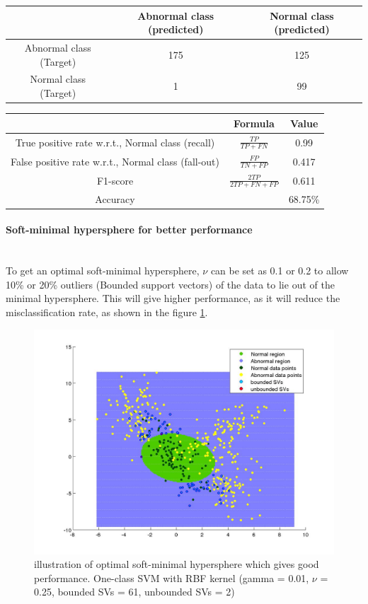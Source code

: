 \documentclass[fleqn]{article}
\newcommand{\myparagraph}[1]{\paragraph{#1}\mbox{}\\}
\begin{document}
\begin{center}
  \begin{longtable}{ c | c | c  }
	\multicolumn{1}{c}{ } & 
	\multicolumn{1}{c}{Abnormal class (predicted)} & 
	\multicolumn{1}{c}{Normal class (predicted)} \\
    \hline
    Abnormal class (Target)& 175 & 125 \\ \hline
    Normal class (Target)&  1 & 99 \\ \hline
  \end{longtable}
\end{center}    

\begin{center}
  \begin{longtable}{ c | c | c  }
  	\multicolumn{1}{c}{ } & 
	\multicolumn{1}{c}{Formula} & 
	\multicolumn{1}{c}{Value} \\\hline
	True positive rate w.r.t., Normal class (recall)  & $\frac{TP}{TP + FN}$ & 0.99 \\\hline
	False positive rate w.r.t., Normal class (fall-out)  & $\frac{FP}{TN + FP}$ & 0.417\\\hline
	F1-score & $\frac{2TP}{2TP + FN + FP}$ & 0.611\\\hline
	Accuracy & & 68.75\%\\\hline
  \end{longtable}
\end{center} 

\myparagraph{Soft-minimal hypersphere for better performance}
To get an optimal soft-minimal hypersphere, $\nu$ can be set as 0.1 or 0.2 to allow 10\% or 20\%
outliers (Bounded support vectors) of the data to lie out of the minimal hypersphere. This will give higher performance, as it will reduce the misclassification rate, as shown in the figure \ref{fig:softminsphere}.

\begin{figure}[t!]
    \centering
 	\includegraphics[scale=0.3]{./pics/task2_decisionregion_g=0.01_n=0.25.jpg}
     \caption{illustration of optimal soft-minimal hypersphere which gives good performance\label{fig:softminsphere}.
     One-class SVM with RBF kernel (gamma = 0.01, $\nu$ = 0.25, bounded SVs = 61, unbounded SVs = 2)}
\end{figure}
\end{document}
